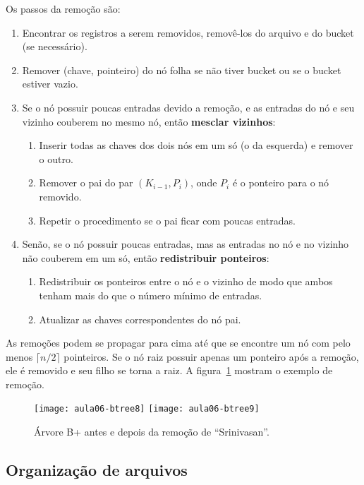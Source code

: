 Os passos da remoção são:
\begin{enumerate}
\item Encontrar os registros a serem removidos, removê-los do
arquivo e do bucket (se necessário).
\item Remover (chave, pointeiro) do nó folha se não tiver bucket ou se 
o bucket estiver vazio.
\item Se o nó possuir poucas entradas devido a remoção, e as entradas 
do nó e seu vizinho couberem no mesmo nó, então \textbf{mesclar vizinhos}:
	\begin{enumerate}
	\item Inserir todas as chaves dos dois nós em um só (o da esquerda) e 
	remover o outro.
	\item Remover o pai do par $(K_{i-1}, P_i)$, onde $P_i$ é o ponteiro
	para o nó removido.
	\item Repetir o procedimento se o pai ficar com poucas entradas.
	\end{enumerate}
\item Senão, se o nó possuir poucas entradas, mas as entradas no nó
e no vizinho não couberem em um só, então \textbf{redistribuir ponteiros}:
	\begin{enumerate}
	\item Redistribuir os ponteiros entre o nó e o vizinho de modo
	que ambos tenham mais do que o número mínimo de entradas.
	\item Atualizar as chaves correspondentes do nó pai.
	\end{enumerate}
\end{enumerate}

As remoções podem se propagar para cima até que se encontre um nó com pelo 
menos $\lceil n/2 \rceil$ pointeiros.
Se o nó raiz possuir apenas um ponteiro após a remoção, ele é removido e seu filho
se torna a raiz.
A figura~\ref{aula06:fig:btree8} mostram o exemplo de remoção.
%
\begin{figure}[!htb]
\centering
\texttt{[image: aula06-btree8]}
\texttt{[image: aula06-btree9]}
\caption{Árvore B+ antes e depois da remoção de ``Srinivasan''.}
\label{aula06:fig:btree8}
\end{figure}

\subsection{Organização de arquivos}


